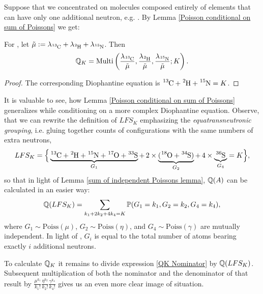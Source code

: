 Suppose that we concentrated on molecules composed entirely of elements that can have only one additional neutron, e.g. \smallMolecule. By Lemma \ref{Poisson conditional on sum of Poissons} we get:

\begin{result}\label{Multinomial Result}
 	For \smallMolecule, let $\tilde{\mu} := \lambda_\cem{^{13}C} + \lambda_\cem{^{2}H} + \lambda_\cem{^{15}N}$. Then
 	$$\QK = \mathrm{Multi}\left(
 		\frac{\lambda_\cem{^{13}C}}{\tilde{\mu}}, 
 		\frac{\lambda_\cem{^{2}H}}{\tilde{\mu}}, 
 		\frac{\lambda_\cem{^{15}N}}{\tilde{\mu}}; K \right).$$
\end{result}

\begin{proof}
	The corresponding Diophantine equation is $\cem{^{13}C} + \cem{^2H} + \cem{^{15}N} = K$.
\end{proof}

It is valuable to see, how Lemma \ref{Poisson conditional on sum of Poissons} generalizes while conditioning on a more complex Diophantine equation. Observe, that we can rewrite the definition of $LFS_K$ emphasizing the {\it equatransneutronic grouping}, i.e. gluing together counts of configurations with the same numbers of extra neutrons,
\begin{equation*}
	LFS_K = \Big\{ \underbrace{\cem{^{13}C} + \cem{^2H} + \cem{^{15}N} + \cem{^{17}O} + \cem{^{33}S}}_{ G_1 } + \,2 \times \underbrace{( \cem{^{18}O} + \cem{^{34}S} )}_{ G_2 } + \,4 \times \underbrace{\cem{^{36}S}}_{ G_4 } = K \Big\},	
\end{equation*}
so that in light of Lemma \ref{sum of independent Poissons lemma}, $\mathbb{Q}(A)$ can be calculated in an easier way: 
$$\mathbb{Q}( LFS_K ) = \sum_{k_1 + 2 k_2 + 4 k_4 = K} \mathbb{P}( G_1 = k_1, G_2 = k_2, G_4 = k_4 ),$$
where $G_1 \sim \mathrm{Poiss}( \mu )$, $G_2 \sim \mathrm{Poiss}( \eta )$, and $G_4 \sim \mathrm{Poiss}( \gamma )$ are mutually independent. In light of \cite{Olson2009Calculations}, $G_i$ is equal to the total number of atoms bearing exactly $i$ additional neutrons.  

To calculate $\mathbb{Q}_K$ it remains to divide expression \eqref{QK Nominator} by $\mathbb{Q}( LFS_K )$. Subsequent multiplication of both the nominator and the denominator of that result by $\frac{\mu^{k_1}}{k_1 !} \frac{\eta^{k_2}}{k_2 !} \frac{\gamma^{k_4}}{k_4 !}$ gives us an even more clear image of situation.


